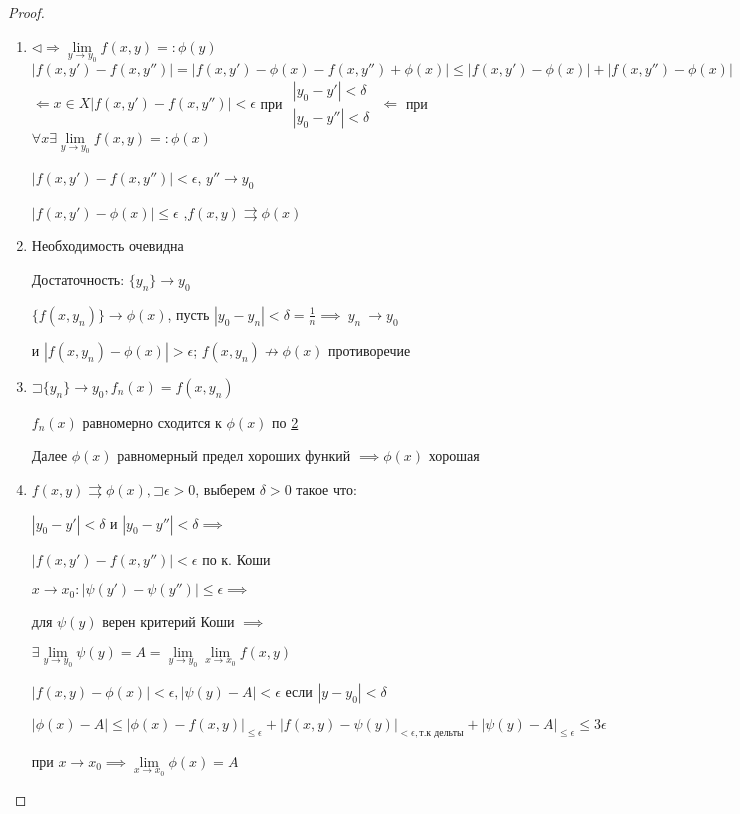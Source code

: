 \documentclass[a4paper, 12pt]{article}
\newcommand\letsymbol{\mathord{\sqsupset}}
\theoremstyle{definition}
\theoremstyle{remark}
\begin{document}
\begin{proof}
     \begin{enumerate}
          \item $\triangleleft \Rightarrow  \lim\limits_{y \to y_0}f(x,y) =: \phi(y)$\hfill \break 
          $|f(x,y') - f(x,y'')| = |f(x,y') - \phi(x) - f(x,y'')+\phi(x)| \le |f(x,y') - \phi(x)| + |f(x,y'')-\phi(x)|$\hfill \break
          $\Leftarrow x \in X |f(x,y') - f(x,y'')| < \epsilon$ при
          $
          \begin{array}{l}
               |y_0 - y'|< \delta\\
               |y_0 - y''|<\delta
          \end{array}
          $
          $\Leftarrow$ при $\forall x \exists \lim\limits_{y\to y_0}f(x,y)=:\phi(x)$
     
          $|f(x,y')-f(x,y'')| < \epsilon$, $y''\rightarrow y_0$
     
          $|f(x,y')-\phi(x)| \le\epsilon$ ,$f(x,y) \rightrightarrows \phi(x)$
          \item \hypertarget{p1}{Необходимость очевидна}
          
          Достаточность: $\{y_n\} \rightarrow y_0$
     
          $\{f(x,y_n)\} \rightarrow \phi(x)$, пусть $|y_0 - y_n|< \delta = \frac{1}{n} \implies {\ y_n}\ \rightarrow y_0$ 
          
          и $|f(x,y_n) - \phi(x)|>\epsilon$; $f(x,y_n) \nrightarrow\phi(x)$ противоречие
          \item $\letsymbol \{y_n \} \rightarrow y_0, f_n(x) = f(x, y_n)$
          
          $f_n(x)$ равномерно сходится к $\phi(x)$ по \hyperlink{p1}{2}
     
          Далее $\phi(x)$  равномерный предел хороших функий $\implies \phi(x)$ хорошая
          \item $f(x,y) \rightrightarrows \phi(x), \letsymbol \epsilon>0$, выберем $\delta >0$ такое что:
          
          $|y_0 - y'| < \delta$ и $|y_0-y''|< \delta \implies$
     
          $|f(x,y') - f(x,y'')|< \epsilon$ по к. Коши
     
          $x \to x_0 : |\psi(y') - \psi(y'')| \leq \epsilon \implies$
          
          для $\psi(y)$ верен критерий Коши $\implies$
     
          $\exists \lim\limits_{y \to y_0}\psi(y) = A = \lim\limits_{y \to y_0}\lim\limits_{x \to x_0}f(x,y)$
     
          $|f(x,y) - \phi(x)|< \epsilon, |\psi(y) - A|< \epsilon$ если $|y - y_0|< \delta$
     
          $|\phi(x)-A| \leq {|\phi(x) - f(x,y)|}_{\leq\epsilon}+{|f(x,y) - \psi(y)|}_{<\epsilon, \text{т.к дельты}} + {|\psi(y) - A|}_{\leq\epsilon} \leq 3\epsilon$
     
          при $x \to x_0 \implies \lim\limits_{x\to x_0}\phi(x) = A$ 
     \end{enumerate}
\end{proof}
\end{document}
